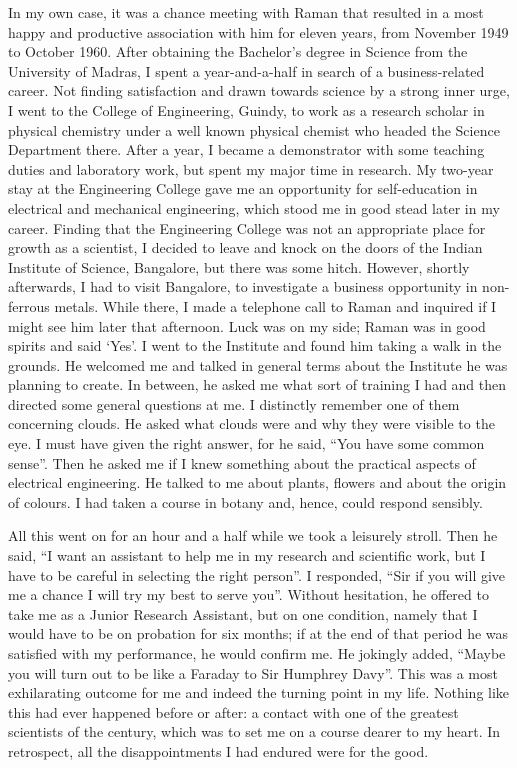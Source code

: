 In my own case, it was a chance meeting with Raman that
resulted in a most happy and productive association with him
for eleven years, from November 1949 to October 1960. After
obtaining the Bachelor's degree in Science from the University
of Madras, I spent a year-and-a-half in search of a business-related
career. Not finding satisfaction and drawn towards science by
a strong inner urge, I went to the College of Engineering, Guindy,
to work as a research scholar in physical chemistry under a well
known physical chemist who headed the Science Department
there. After a year, I became a demonstrator with some teaching
duties and laboratory work, but spent my major time in research.
My two-year stay at the Engineering College gave me an
opportunity for self-education in electrical and mechanical
engineering, which stood me in good stead later in my career.
Finding that the Engineering College was not an appropriate
place for growth as a scientist, I decided to leave and knock on
the doors of the Indian Institute of Science, Bangalore, but there
was some hitch. However, shortly afterwards, I had to visit
Bangalore, to investigate a business opportunity in non-ferrous
metals. While there, I made a telephone call to Raman and
inquired if I might see him later that afternoon. Luck was on
my side; Raman was in good spirits and said `Yes'. I went to
the Institute and found him taking a walk in the grounds. He
welcomed me and talked in general terms about the Institute he
was planning to create. In between, he asked me what sort of
training I had and then directed some general questions at me.
I distinctly remember one of them concerning clouds. He asked
what clouds were and why they were visible to the eye. I must
have given the right answer, for he said, ``You have some common
sense''. Then he asked me if I knew something about the practical
aspects of electrical engineering. He talked to me about plants,
flowers and about the origin of colours. I had taken a course
in botany and, hence, could respond sensibly.

All this went on for an hour and a half while we took a
leisurely stroll. Then he said, ``I want an assistant to help me
in my research and scientific work, but I have to be careful in
selecting the right person''. I responded, ``Sir if you will give
me a chance I will try my best to serve you''. Without hesitation,
he offered to take me as a Junior Research Assistant, but on one
condition, namely that I would have to be on probation for six
months; if at the end of that period he was satisfied with my
performance, he would confirm me. He jokingly added, ``Maybe
you will turn out to be like a Faraday to Sir Humphrey Davy''.
This was a most exhilarating outcome for me and indeed the
turning point in my life. Nothing like this had ever happened
before or after: a contact with one of the greatest scientists
of the century, which was to set me on a course dearer to my
heart. In retrospect, all the disappointments I had endured were
for the good.

